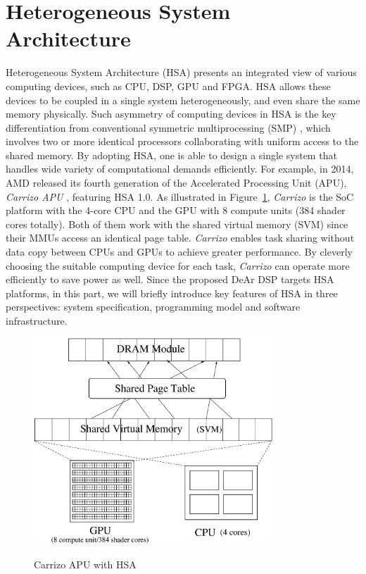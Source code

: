     \section{Heterogeneous System Architecture}
    Heterogeneous System Architecture (HSA) presents an integrated view of various computing devices, 
    such as CPU, DSP, GPU and FPGA.
    HSA allows these devices to be coupled in a single system heterogeneously, and even share the same memory physically.
    Such asymmetry of computing devices in HSA is the key differentiation from conventional symmetric multiprocessing (SMP) \cite{parallel},
    which involves two or more identical processors collaborating with uniform access to the shared memory.
    By adopting HSA, one is able to design a single system that handles wide variety of computational demands efficiently.
    For example, in 2014, AMD released its fourth generation of the Accelerated Processing Unit (APU), \textit{Carrizo APU} \cite{carrizo}, featuring HSA 1.0.
    As illustrated in Figure~\ref{fig:carrizo}, \textit{Carrizo} is the SoC platform with the 4-core CPU and the GPU with 8 compute units (384 shader cores totally).
    Both of them work with the shared virtual memory (SVM) since their MMUs access an identical page table.
    \textit{Carrizo} enables task sharing without data copy between CPUs and GPUs to achieve greater performance.
    By cleverly choosing the suitable computing device for each task, 
    \textit{Carrizo} can operate more efficiently to save power as well.
    Since the proposed DeAr DSP targets HSA platforms, 
    in this part, we will briefly introduce key features of HSA in three perspectives: 
    system specification, programming model and software infrastructure.
        \begin{figure}[!ht] 
            \caption{Carrizo APU with HSA}
            \centering
            \includegraphics[width=0.8\textwidth]{./figs/carrizo.eps}
            \label{fig:carrizo}
        \end{figure}
